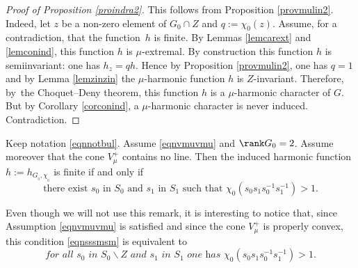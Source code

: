 \begin{proof}[Proof of Proposition \ref{proindra2}]
This follows from Proposition \ref{provmulin2}.
Indeed, let $z$ be a non-zero element of $G_0\cap Z$ and $q:=\chi_0(z)$.
Assume, for a contradiction, that the function~$h$ is finite.
By Lemmas \ref{lemcarext} and \ref{lemconind},
this function $h$ is $\mu$-extremal.
By construction this function $h$ is semiinvariant: one has
$h_z=qh$. Hence by Proposition \ref{provmulin2}, one has $q=1$
and by Lemma \ref{lemzinzin} the $\mu$-harmonic function $h$ is $Z$-invariant.
Therefore, by~the Choquet--Deny theorem, this function $h$
is a $\mu$-harmonic character of $G$.
But by Corollary \ref{corconind}, a $\mu$-harmonic character is never induced.
Contradiction.
\end{proof}

\begin{Prop}

\label{proindra3}
Keep notation \eqref{eqnnotbul}. Assume \eqref{eqnvmuvmu} and $\rank G_0=2$.
Assume moreover that the cone $V^+_\mu$ contains no line.
Then the induced harmonic function $h:=h_{G_{_0},\chi_{_0}}$ is finite if and only if
\begin{equation}
\label{eqnsssmsm}
\text{there exist $s_0$ in $S_0$ and $s_1$ in $S_1$ such that $\chi_0(s_0s_1s_0^{-1}s_1^{-1})>1$.}
\end{equation}
\end{Prop}

\begin{Rem} Even though we will not use this remark, it is interesting to notice
that, since Assumption \eqref{eqnvmuvmu} is satisfied and since
the cone $V^+_\mu$ is properly convex,
this condition \eqref{eqnsssmsm} is equivalent to\vspace*{-3pt}
\begin{equation}
\label{eqnsssmsm2}
\textit{for all $s_0$ in $S_0\smallsetminus Z$ and $s_1$ in $S_1$ one has $\chi_0(s_0s_1s_0^{-1}s_1^{-1})>1$.}
\end{equation}
\end{Rem}

